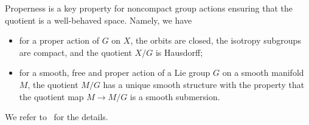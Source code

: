 \documentclass[a4paper]{amsart}
\theoremstyle{definition}
\theoremstyle{remark}
\numberwithin{equation}{section}
\newcommand{\<}{\langle}
\renewcommand{\>}{\rangle}
\begin{document}
Properness is a key property for noncompact group actions ensuring that the quotient is a well-behaved space. Namely, we have
\begin{itemize}
\item for a proper action of $G$ on $X$, the orbits are closed, the isotropy subgroups are compact, and the quotient $X/G$ is Hausdorff;

\item for a smooth, free and proper action of a Lie group $G$ on a smooth manifold~$M$, the quotient $M/G$ has a unique smooth structure with the property that the quotient map $M\to M/G$ is a smooth submersion.
\end{itemize}
We refer to~\cite[Chapter~21]{lee13} for the details.

\end{document}
